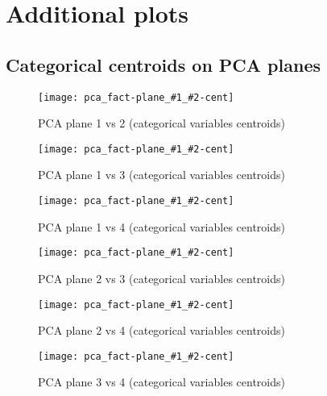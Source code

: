 

\section{Additional plots}%
\label{sec:additional_plots}

\newcommand{\centroidmap}[2]{
    \begin{figure}[H]
        \centering
        \texttt{[image: pca\_fact-plane\_\#1\_\#2-cent]}
        \caption{PCA plane #1 vs #2 (categorical variables centroids)}%
        \label{fig:plane_#1-#2-cent}
    \end{figure}
}

\begin{landscape}

\subsection{Categorical centroids on PCA planes}%
\label{sub:add_centroids}

\centroidmap{1}{2}
\centroidmap{1}{3}
\centroidmap{1}{4}
\centroidmap{2}{3}
\centroidmap{2}{4}
\centroidmap{3}{4}
\end{landscape}


%
%
%
